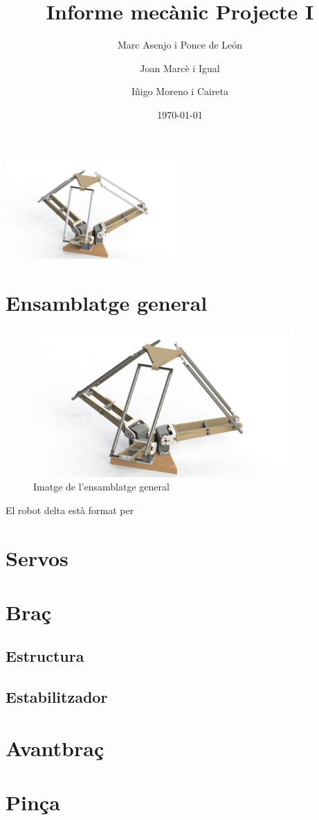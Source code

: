 \documentclass[a4paper, 10pt]{article}
\begin{document}
\title{Informe mecànic Projecte I}
\author{Marc Asenjo i Ponce de León \and
		Joan Marcè i Igual \and
		Iñigo Moreno i Caireta}
\date{\today}
\maketitle
\begin{center}
\includegraphics[width=0.5\textwidth]{./images/logo}
\end{center}

\newpage
\tableofcontents{}

\newpage
\section{Ensamblatge general}


\begin{figure}[h!]
\centering
\includegraphics[width=10cm]{./images/general}
\caption{Imatge de l'ensamblatge general}
\end{figure}

El robot delta està format per


\newpage
\section{Servos}


\newpage
\section{Braç}

\subsection{Estructura}

\subsection{Estabilitzador}

\newpage
\section{Avantbraç}

\newpage
\section{Pinça}
\end{document}
